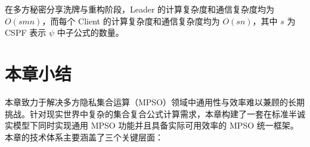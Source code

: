 在多方秘密分享洗牌与重构阶段，Leader 的计算复杂度和通信复杂度均为 $O(smn)$，而每个 Client 的计算复杂度和通信复杂度均为 $O(sn)$，其中 $s$ 为 CSPF 表示 $\psi$ 中子公式的数量。






\section{本章小结}

本章致力于解决多方隐私集合运算（MPSO）领域中通用性与效率难以兼顾的长期挑战。针对现实世界中复杂的集合复合公式计算需求，本章构建了一套在标准半诚实模型下同时实现通用 MPSO 功能并且具备实际可用效率的 MPSO 统一框架。本章的技术体系主要涵盖了三个关键层面：

